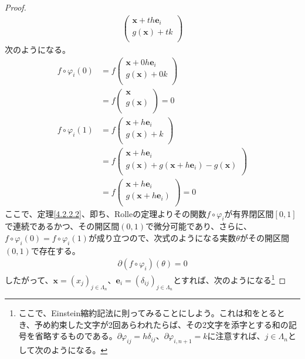 \documentclass[dvipdfmx]{jsarticle}
\begin{document}
\begin{proof}
\begin{align*}
\begin{pmatrix}
\mathbf{x} + th\mathbf{e}_{i} \\
g\left( \mathbf{x} \right) + tk \\
\end{pmatrix}
\end{align*}
次のようになる。
\begin{align*}
f \circ \varphi_{i}(0) &= f\begin{pmatrix}
\mathbf{x} + 0h\mathbf{e}_{i} \\
g\left( \mathbf{x} \right) + 0k \\
\end{pmatrix} \\
&= f\begin{pmatrix}
\mathbf{x} \\
g\left( \mathbf{x} \right) \\
\end{pmatrix} = 0\\
f \circ \varphi_{i}(1) &= f\begin{pmatrix}
\mathbf{x} + h\mathbf{e}_{i} \\
g\left( \mathbf{x} \right) + k \\
\end{pmatrix} \\
&= f\begin{pmatrix}
\mathbf{x} + h\mathbf{e}_{i} \\
g\left( \mathbf{x} \right) + g\left( \mathbf{x} + h\mathbf{e}_{i} \right) - g\left( \mathbf{x} \right) \\
\end{pmatrix}\\
&= f\begin{pmatrix}
\mathbf{x} + h\mathbf{e}_{i} \\
g\left( \mathbf{x} + h\mathbf{e}_{i} \right) \\
\end{pmatrix} = 0
\end{align*}
ここで、定理\ref{4.2.2.2}、即ち、Rolleの定理よりその関数$f \circ \varphi_{i}$が有界閉区間$[ 0,1]$で連続であるかつ、その開区間$(0,1)$で微分可能であり、さらに、$f \circ \varphi_{i}(0) = f \circ \varphi_{i}(1)$が成り立つので、次式のようになる実数$\theta$がその開区間$(0,1)$で存在する。
\begin{align*}
\partial(f \circ \varphi_{i})(\theta) = 0
\end{align*}
したがって、$\mathbf{x} = \left( x_{j} \right)_{j \in \varLambda_{n}}$、$\mathbf{e}_{i} = \left( \delta_{ij} \right)_{j \in \varLambda_{n}}$とすれば、次のようになる\footnote{ここで、Einstein縮約記法に則ってみることにしよう。これは和をとるとき、予め約束した文字が2回あらわれたらば、その2文字を添字とする和の記号を省略するものである。$\partial \varphi_{ij} =h\delta_{ij}$、$\partial \varphi_{i,n+1} =k$に注意すれば、$j\in \varLambda_{n}$として次のようになる。
}
\end{proof}
\end{document}
